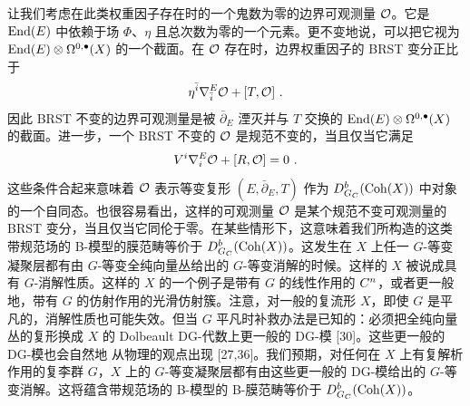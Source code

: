 让我们考虑在此类权重因子存在时的一个鬼数为零的边界可观测量 $\mathcal{O}$。它是 $\operatorname{End}(E)$ 中依赖于场 $\Phi$、$\eta$ 且总次数为零的一个元素。更不变地说，可以把它视为 $\operatorname{End}(E)\otimes\Omega^{0,\bullet}(X)$ 的一个截面。在 $\mathcal{O}$ 存在时，边界权重因子的 BRST 变分正比于
\[ \eta^{\bar i}\nabla^E_{\bar i}\cO + [T,\cO] \ . \]
因此 BRST 不变的边界可观测量是被 $\bar\partial_E$ 湮灭并与 $T$ 交换的 $\operatorname{End}(E)\otimes\Omega^{0,\bullet}(X)$ 的截面。进一步，一个 BRST 不变的 $\mathcal{O}$ 是规范不变的，当且仅当它满足
\[ V^i\nabla^E_i\mathcal{O} + [R,\mathcal{O}] = 0 \ . \]
这些条件合起来意味着 $\mathcal{O}$ 表示等变复形 $(E,\bar\partial_E,T)$ 作为 $D^b_{G_C}(\operatorname{Coh}(X))$ 中对象的一个自同态。也很容易看出，这样的可观测量 $\mathcal{O}$ 是某个规范不变可观测量的 BRST 变分，当且仅当它同伦于零。在某些情形下，这意味着我们所构造的这类带规范场的 B-模型的膜范畴等价于 $D^b_{G_C}(\operatorname{Coh}(X))$。这发生在 $X$ 上任一 $G$-等变凝聚层都有由 $G$-等变全纯向量丛给出的 $G$-等变消解的时候。这样的 $X$ 被说成具有 $G$-消解性质。这样的 $X$ 的一个例子是带有 $G$ 的线性作用的 $C^n$，或者更一般地，带有 $G$ 的仿射作用的光滑仿射簇。注意，对一般的复流形 $X$，即使 $G$ 是平凡的，消解性质也可能失效。但当 $G$ 平凡时补救办法是已知的：必须把全纯向量丛的复形换成 $X$ 的 Dolbeault DG-代数上更一般的 DG-模 [30]。这些更一般的 DG-模也会自然地
从物理的观点出现 [27,36]。我们预期，对任何在 $X$ 上有复解析作用的复李群 $G$，$X$ 上的 $G$-等变凝聚层都有由这些更一般的 DG-模给出的 $G$-等变消解。这将蕴含带规范场的 B-模型的 B-膜范畴等价于 $D^b_{G_C}(\operatorname{Coh}(X))$。


